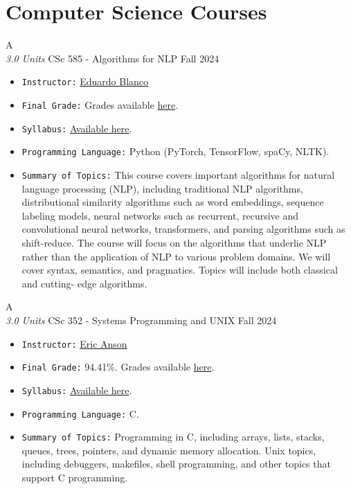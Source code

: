 \section{Computer Science Courses}


\cventry
{A \\ \small{\textit{3.0 Units}}}
{CSc 585 -  Algorithms for NLP}
{Fall 2024}
{}
{}
{
  \begin{itemize}
    \item \texttt{Instructor:} \href{https://eduardoblanco.github.io/}{Eduardo Blanco}
    \item \texttt{Final Grade:} Grades available \href{https://mhrezaei.com/assets/cv/courses/Fall2024/CSC585/Grades.pdf}{here}.
    \item \texttt{Syllabus:} \href{https://mhrezaei.com/assets/cv/courses/Fall2024/CSC585/Syllabus.pdf}{Available here}.
    \item \texttt{Programming Language:} Python (PyTorch, TensorFlow, spaCy, NLTK).
    \item \texttt{Summary of Topics:} This course covers important algorithms for natural language processing (NLP), including
    traditional NLP algorithms, distributional similarity algorithms such as word embeddings,
    sequence labeling models, neural networks such as recurrent, recursive and convolutional neural
    networks, transformers, and parsing algorithms such as shift-reduce. The course will focus on
    the algorithms that underlie NLP rather than the application of NLP to various problem domains.
    We will cover syntax, semantics, and pragmatics. Topics will include both classical and cutting-
    edge algorithms.
  \end{itemize}
}

\cventry
{A \\ \small{\textit{3.0 Units}}}
{CSc 352 - Systems Programming and UNIX}
{Fall 2024}
{}
{}
{
  \begin{itemize}
    \item \texttt{Instructor:} \href{https://www.cs.arizona.edu/person/eric-anson}{Eric Anson}
    \item \texttt{Final Grade:} 94.41\%. Grades available \href{https://mhrezaei.com/assets/cv/courses/Fall2024/CSC352/Grades.pdf}{here}.
    \item \texttt{Syllabus:} \href{https://mhrezaei.com/assets/cv/courses/Fall2024/CSC352/Syllabus.pdf}{Available here}.
    \item \texttt{Programming Language:} C.
    \item \texttt{Summary of Topics:} Programming in C, including arrays, lists, stacks, queues, trees, pointers, and dynamic
    memory allocation. Unix topics, including debuggers, makefiles, shell programming, and other topics that support
    C programming.
  \end{itemize}
}



